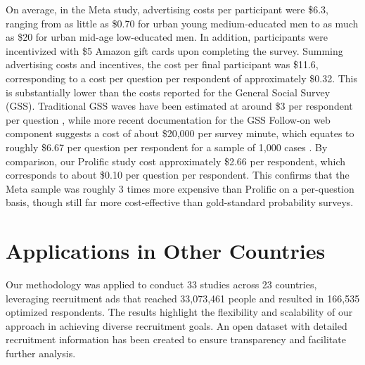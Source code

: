 \documentclass[letterpaper,12pt]{article}
\theoremstyle{proposition}
\begin{document}
 On average, in the Meta study, advertising costs per participant were \$6.3, ranging from as little as \$0.70 for urban young medium-educated men to as much as \$20 for urban mid-age low-educated men. In addition, participants were incentivized with \$5 Amazon gift cards upon completing the survey. Summing advertising costs and incentives, the cost per final participant was \$11.6, corresponding to a cost per question per respondent of approximately \$0.32. This is substantially lower than the costs reported for the General Social Survey (GSS). Traditional GSS waves have been estimated at around \$3 per respondent per question \citep{goel2015non}, while more recent documentation for the GSS Follow-on web component suggests a cost of about \$20,000 per survey minute, which equates to roughly \$6.67 per question per respondent for a sample of 1,000 cases \citep{norc2024gss}. By comparison, our Prolific study cost approximately \$2.66 per respondent, which corresponds to about \$0.10 per question per respondent. This confirms that the Meta sample was roughly 3 times more expensive than Prolific on a per-question basis, though still far more cost-effective than gold-standard probability surveys.





\section*{Applications in Other Countries}

Our methodology was applied to conduct 33 studies across 23 countries, leveraging recruitment ads that reached 33,073,461 people and resulted in 166,535 optimized respondents. The results highlight the flexibility and scalability of our approach in achieving diverse recruitment goals. An open dataset with detailed recruitment information has been created to ensure transparency and facilitate further analysis.
\end{document}
